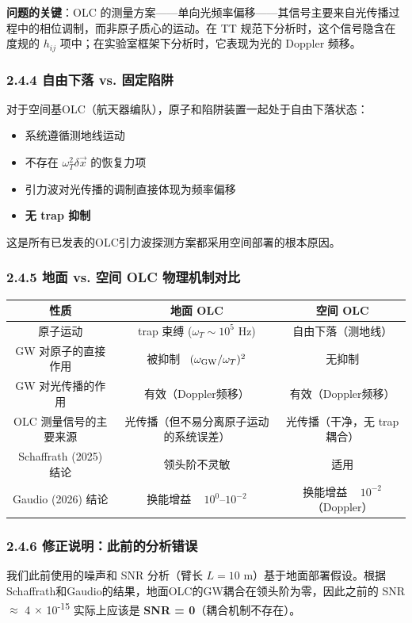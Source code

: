 \documentclass[12pt,a4paper]{article}
\begin{document}
\textbf{问题的关键}：OLC 的测量方案——单向光频率偏移——其信号主要来自光传播过程中的相位调制，而非原子质心的运动。在 TT 规范下分析时，这个信号隐含在度规的 $h_{ij}$ 项中；在实验室框架下分析时，它表现为光的 Doppler 频移。
\subsubsection{2.4.4 自由下落 vs. 固定陷阱}


对于空间基OLC（航天器编队），原子和陷阱装置一起处于自由下落状态：

\begin{itemize}
  \item 系统遵循测地线运动
  \item 不存在 $\omega_T^2 \delta \vec{x}$ 的恢复力项
  \item 引力波对光传播的调制直接体现为频率偏移
  \item \textbf{无 trap 抑制}
\end{itemize}
这是所有已发表的OLC引力波探测方案都采用空间部署的根本原因。
\subsubsection{2.4.5 地面 vs. 空间 OLC 物理机制对比}


\begin{tabular}{|c|c|c|}
\hline
性质 & 地面 OLC & 空间 OLC \\
\hline
原子运动 & trap 束缚 ($\omega_T \sim 10^5$ Hz) & 自由下落（测地线） \\
GW 对原子的直接作用 & 被抑制 ~$(\omega_{\rm GW}/\omega_T)^2$ & 无抑制 \\
GW 对光传播的作用 & 有效（Doppler频移） & 有效（Doppler频移） \\
OLC 测量信号的主要来源 & 光传播（但不易分离原子运动的系统误差） & 光传播（干净，无 trap 耦合） \\
Schaffrath (2025) 结论 & 领头阶不灵敏 & 适用 \\
Gaudio (2026) 结论 & 换能增益 ~ $10^{0}\text{--}10^{-2}$ & 换能增益 ~ $10^{-2}$（Doppler） \\
\hline
\end{tabular}


\subsubsection{2.4.6 修正说明：此前的分析错误}


我们此前使用的噪声和 SNR 分析（臂长 $L = 10$ m）基于地面部署假设。根据Schaffrath和Gaudio的结果，地面OLC的GW耦合在领头阶为零，因此之前的 SNR $\approx$ 4 $\times$ 10\textsuperscript{-15} 实际上应该是 \textbf{SNR = 0}（耦合机制不存在）。
\end{document}

